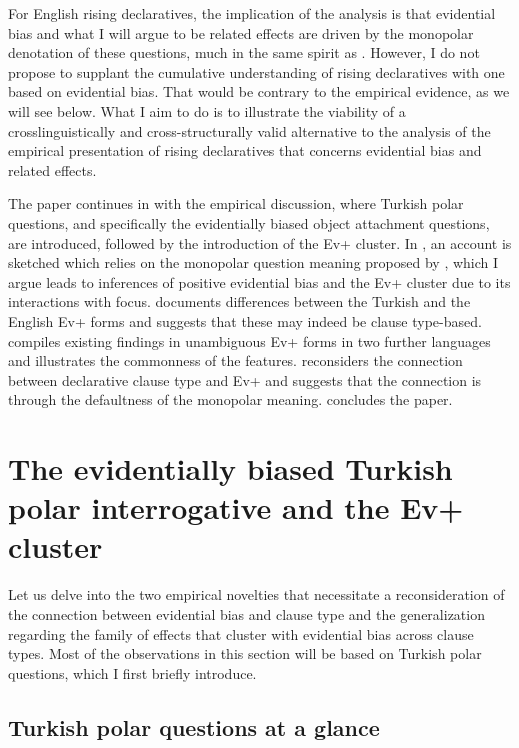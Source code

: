 \documentclass[output=paper,colorlinks,citecolor=brown]{langscibook}
\begin{document}
For English rising declaratives, the implication of the analysis is that evidential bias and what I will argue to be related effects are driven by the monopolar denotation of these questions, much in the same spirit as \citet{rudin-rd}. However, I do not propose to supplant the cumulative understanding of rising declaratives with one based on evidential bias. That would be contrary to the empirical evidence, as we will see below. What I aim to do is to illustrate the viability of a crosslinguistically and cross-structurally valid alternative to the analysis of the empirical presentation of rising declaratives that concerns evidential bias and related effects.
 
The paper continues in  with the empirical discussion, where Turkish polar questions, and specifically the evidentially biased object attachment questions, are introduced, followed by the introduction of the Ev+ cluster. In , an account is sketched which relies on the monopolar question meaning proposed by \citet{krifka15}, which I argue leads to inferences of positive evidential bias and the Ev+ cluster due to its interactions with focus.  documents differences between the Turkish and the English Ev+ forms and suggests that these may indeed be clause type-based.  compiles existing findings in unambiguous Ev+ forms in two further languages and illustrates the commonness of the features.  reconsiders the connection between declarative clause type and Ev+ and suggests that the connection is through the defaultness of the monopolar meaning.  concludes the paper.

\section{The evidentially biased Turkish polar interrogative and the Ev+ cluster}\label{sec:11:2}

Let us delve into the two empirical novelties that necessitate a reconsideration of the connection between evidential bias and clause type and the generalization regarding the family of effects that cluster with evidential bias across clause types. Most of the observations in this section will be based on Turkish polar questions, which I first briefly introduce. 

\subsection{Turkish polar questions at a glance}\label{sec:11:2:1}
\end{document}
